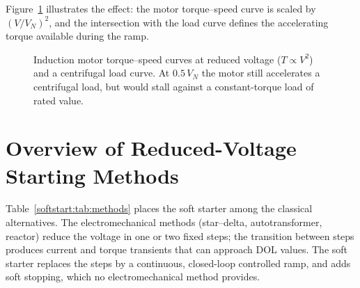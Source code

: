 Figure~\ref{softstart:fig:torquespeed} illustrates the effect: the motor torque--speed
curve is scaled by $(V/V_N)^2$, and the intersection with the load curve
defines the accelerating torque available during the ramp.

\begin{figure}[htb]
\centering
{}
\caption{Induction motor torque--speed curves at reduced voltage
($T \propto V^2$) and a centrifugal load curve. At $0.5\,V_N$ the motor
still accelerates a centrifugal load, but would stall against a
constant-torque load of rated value.}
\label{softstart:fig:torquespeed}
\end{figure}

\section{Overview of Reduced-Voltage Starting Methods}

Table~\ref{softstart:tab:methods} places the soft starter among the classical
alternatives. The electromechanical methods (star--delta, autotransformer,
reactor) reduce the voltage in one or two fixed steps; the transition
between steps produces current and torque transients that can approach DOL
values. The soft starter replaces the steps by a continuous, closed-loop
controlled ramp, and adds soft stopping, which no electromechanical method
provides.

